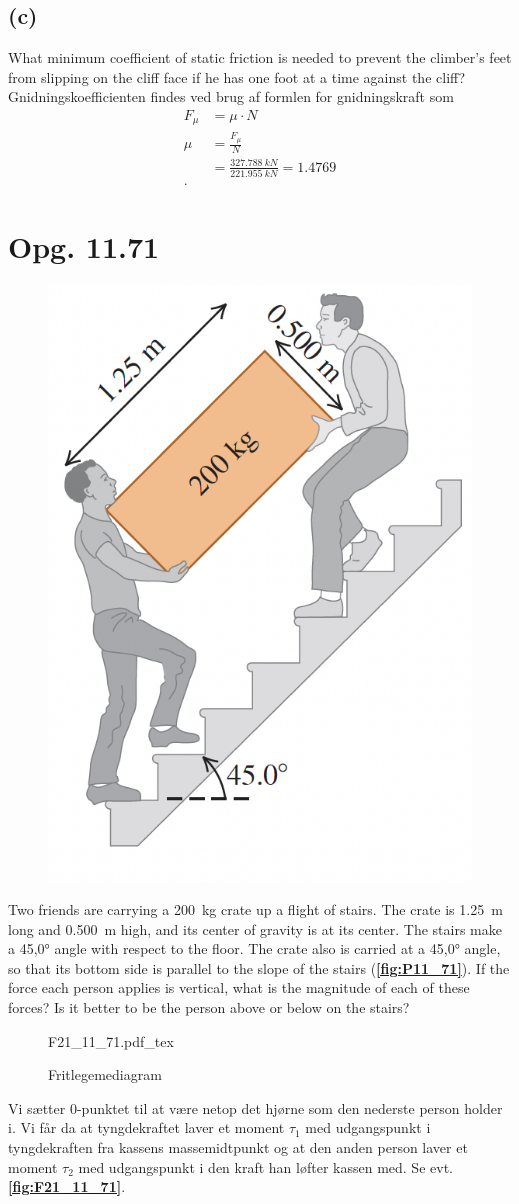 \documentclass[12pt]{article}
\newcommand{\incfig}[2][1]{%
  \def\svgwidth{#1\columnwidth}
  {#2.pdf_tex}
}
\theoremstyle{definition}
\begin{document}
\subsection*{(c)}
What minimum coefficient of static friction is needed to prevent the climber’s feet from slipping on the cliff face if he has one foot at a time against the cliff?
\bigbreak
Gnidningskoefficienten findes ved brug af formlen for gnidningskraft som
\begin{align*}
  F_\mu &= \mu \cdot N \\
  \mu &= \frac{F_{\mu}}{N} \\
  &= \frac{\qty{327,788}{kN}}{\qty{221,955}{kN}} = \num{1,4769}  \\
.\end{align*}



\section*{Opg. 11.71}
\begin{figure} [ht]
  \centering
  \caption{}
  \includegraphics[width=0.15\linewidth]{../figures/P11_71.png}
  \label{fig:P11_71}
\end{figure}


Two friends are carrying a \qty{200}{kg} crate up a flight of stairs. The crate is \qty{1,25}{m} long and \qty{0,500}{m} high, and its center of gravity is at its center. The stairs make a \ang{45,0} angle with respect to the floor. The crate also is carried at a \ang{45,0} angle, so that its bottom side is parallel to the slope of the stairs (\textbf{\autoref{fig:P11_71}}). If the force each person applies is vertical, what is the magnitude of each of these forces? Is it better to be the person above or below on the stairs?

\begin{figure}[ht]
  \centering
  \incfig[0.8]{F21_11_71}
  \caption{Fritlegemediagram}
  \label{fig:F21_11_71}
\end{figure}

\bigbreak
Vi sætter 0-punktet til at være netop det hjørne som den nederste person holder i. Vi får da at tyngdekraftet laver et moment $\tau_1$ med udgangspunkt i tyngdekraften fra kassens massemidtpunkt og at den anden person laver et moment $\tau_2$ med udgangspunkt i den kraft han løfter kassen med. Se evt. \textbf{\autoref{fig:F21_11_71}}.
\end{document}
